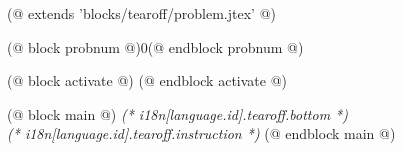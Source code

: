 (@ extends 'blocks/tearoff/problem.jtex' @)

(@ block probnum @)0(@ endblock probnum @)

(@ block activate @)
(@ endblock activate @)

(@ block main @)
    \centering
    \vspace*{(* competition.tearoff.bottomsep *)mm}
    \LARGE
    \textit{(* i18n[language.id].tearoff.bottom *)}
    \\[2mm]
    \small
    \textit{(* i18n[language.id].tearoff.instruction *)}
(@ endblock main @)
